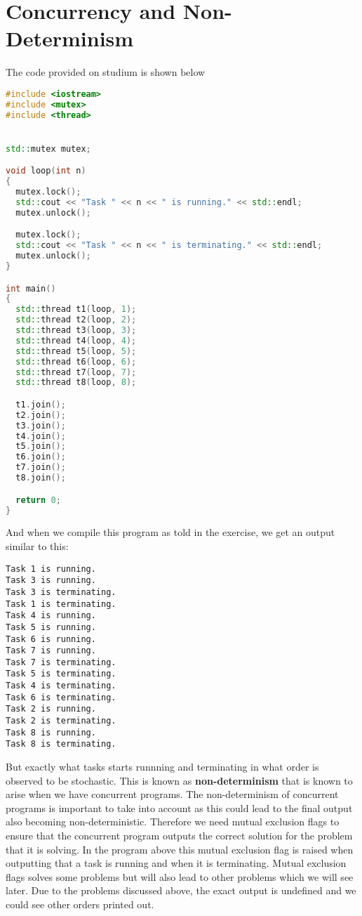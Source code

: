 \section{Concurrency and Non-Determinism}

The code provided on studium is shown below

\begin{lstlisting}[language=C++, caption=non-determinism.cpp]
#include <iostream>
#include <mutex>
#include <thread>


std::mutex mutex;

void loop(int n)
{
  mutex.lock();
  std::cout << "Task " << n << " is running." << std::endl;
  mutex.unlock();

  mutex.lock();
  std::cout << "Task " << n << " is terminating." << std::endl;
  mutex.unlock();
}

int main()
{
  std::thread t1(loop, 1);
  std::thread t2(loop, 2);
  std::thread t3(loop, 3);
  std::thread t4(loop, 4);
  std::thread t5(loop, 5);
  std::thread t6(loop, 6);
  std::thread t7(loop, 7);
  std::thread t8(loop, 8);

  t1.join();
  t2.join();
  t3.join();
  t4.join();
  t5.join();
  t6.join();
  t7.join();
  t8.join();

  return 0;
}
\end{lstlisting}

And when we compile this program as told in the exercise, we get an output
similar to this:

\begin{lstlisting}
Task 1 is running.
Task 3 is running.
Task 3 is terminating.
Task 1 is terminating.
Task 4 is running.
Task 5 is running.
Task 6 is running.
Task 7 is running.
Task 7 is terminating.
Task 5 is terminating.
Task 4 is terminating.
Task 6 is terminating.
Task 2 is running.
Task 2 is terminating.
Task 8 is running.
Task 8 is terminating.
\end{lstlisting}

But exactly what tasks starts runnning and terminating in what order is
observed to be stochastic. This is known as \textbf{non-determinism} that is 
known to arise when we have concurrent programs. The non-determinism
of concurrent programs is important to take into account as this could lead to
the final output also becoming non-deterministic. Therefore we need mutual 
exclusion flags to ensure that the concurrent program outputs the correct solution
for the problem that it is solving. In the program above this mutual exclusion
flag is raised when outputting that a task is running and when it is terminating.
Mutual exclusion flags solves some problems but will also lead to other problems
which we will see later. Due to the problems discussed above, the exact output
is undefined and we could see other orders printed out.
